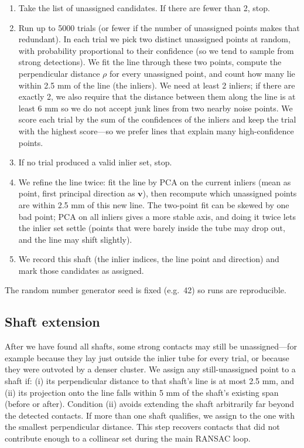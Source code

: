 \documentclass[11pt,a4paper]{article}
\newcommand{\vv}{\mathbf{v}}
\begin{document}
\begin{enumerate}
\item Take the list of unassigned candidates. If there are fewer than 2, stop.
\item Run up to 5000 trials (or fewer if the number of unassigned points makes that redundant). In each trial we pick two distinct unassigned points at random, with probability proportional to their confidence (so we tend to sample from strong detections). We fit the line through these two points, compute the perpendicular distance \(\rho\) for every unassigned point, and count how many lie within 2.5 mm of the line (the inliers). We need at least 2 inliers; if there are exactly 2, we also require that the distance between them along the line is at least 6 mm so we do not accept junk lines from two nearby noise points. We score each trial by the sum of the confidences of the inliers and keep the trial with the highest score---so we prefer lines that explain many high-confidence points.
\item If no trial produced a valid inlier set, stop.
\item We refine the line twice: fit the line by PCA on the current inliers (mean as point, first principal direction as \(\vv\)), then recompute which unassigned points are within 2.5 mm of this new line. The two-point fit can be skewed by one bad point; PCA on all inliers gives a more stable axis, and doing it twice lets the inlier set settle (points that were barely inside the tube may drop out, and the line may shift slightly).
\item We record this shaft (the inlier indices, the line point and direction) and mark those candidates as assigned.
\end{enumerate}
The random number generator seed is fixed (e.g.\ 42) so runs are reproducible.

\subsection{Shaft extension}
After we have found all shafts, some strong contacts may still be unassigned---for example because they lay just outside the inlier tube for every trial, or because they were outvoted by a denser cluster. We assign any still-unassigned point to a shaft if: (i) its perpendicular distance to that shaft’s line is at most 2.5 mm, and (ii) its projection onto the line falls within 5 mm of the shaft’s existing span (before or after). Condition (ii) avoids extending the shaft arbitrarily far beyond the detected contacts. If more than one shaft qualifies, we assign to the one with the smallest perpendicular distance. This step recovers contacts that did not contribute enough to a collinear set during the main RANSAC loop.
\end{document}
